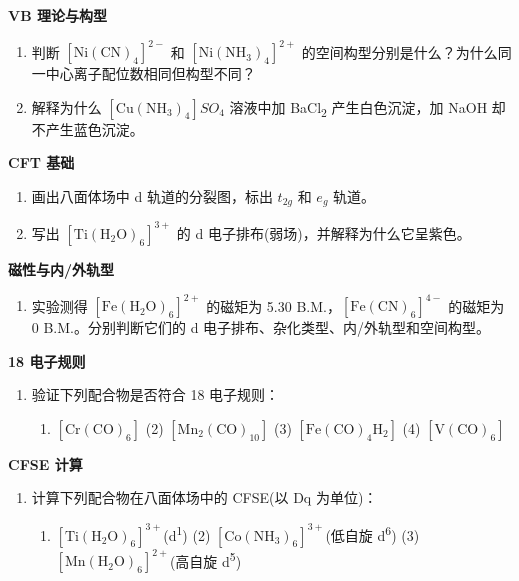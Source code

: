\textbf{VB 理论与构型}

\begin{enumerate}
\def\labelenumi{\arabic{enumi}.}
\setcounter{enumi}{2}
\item
  判断 \(\mathrm{[Ni(CN)_4]^{2-}}\) 和 \(\mathrm{[Ni(NH_3)_4]^{2+}}\) 的空间构型分别是什么？为什么同一中心离子配位数相同但构型不同？
\item
  解释为什么 \([\mathrm{Cu(NH_3)_4}]SO_4\) 溶液中加 BaCl\textsubscript{2} 产生白色沉淀，加 NaOH 却不产生蓝色沉淀。
\end{enumerate}

\textbf{CFT 基础}

\begin{enumerate}
\def\labelenumi{\arabic{enumi}.}
\setcounter{enumi}{4}
\item
  画出八面体场中 d 轨道的分裂图，标出 \(t_{2g}\) 和 \(e_g\) 轨道。
\item
  写出 \(\mathrm{[Ti(H_2O)_6]^{3+}}\) 的 d 电子排布(弱场)，并解释为什么它呈紫色。
\end{enumerate}

\textbf{磁性与内/外轨型}

\begin{enumerate}
\def\labelenumi{\arabic{enumi}.}
\setcounter{enumi}{6}
\tightlist
\item
  实验测得 \([\mathrm{Fe(H_2O)_6}]^{2+}\) 的磁矩为 5.30 B.M.，\([\mathrm{Fe(CN)_6}]^{4-}\) 的磁矩为 0 B.M.。分别判断它们的 d 电子排布、杂化类型、内/外轨型和空间构型。
\end{enumerate}

\textbf{18 电子规则}

\begin{enumerate}
\def\labelenumi{\arabic{enumi}.}
\setcounter{enumi}{7}
\tightlist
\item
  验证下列配合物是否符合 18 电子规则：

  \begin{enumerate}
  \def\labelenumii{(\arabic{enumii})}
  \tightlist
  \item
    \(\mathrm{[Cr(CO)_6]}\) (2) \(\mathrm{[Mn_2(CO)_{10}]}\) (3) \(\mathrm{[Fe(CO)_4H_2]}\) (4) \(\mathrm{[V(CO)_6]}\)
  \end{enumerate}
\end{enumerate}

\textbf{CFSE 计算}

\begin{enumerate}
\def\labelenumi{\arabic{enumi}.}
\setcounter{enumi}{8}
\tightlist
\item
  计算下列配合物在八面体场中的 CFSE(以 Dq 为单位)：

  \begin{enumerate}
  \def\labelenumii{(\arabic{enumii})}
  \tightlist
  \item
    \([\mathrm{Ti(H_2O)_6}]^{3+}\)(d\textsuperscript{1}) (2) \([\mathrm{Co(NH_3)_6}]^{3+}\)(低自旋 d\textsuperscript{6}) (3) \([\mathrm{Mn(H_2O)_6}]^{2+}\)(高自旋 d\textsuperscript{5})
  \end{enumerate}
\end{enumerate}

